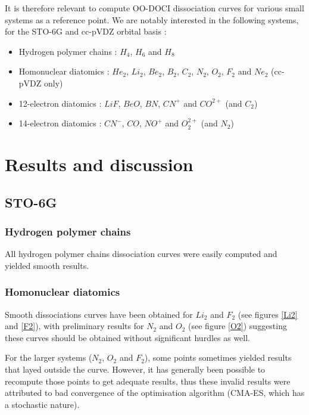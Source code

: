 \documentclass[twoside,twocolumn,9pt]{article}
\begin{document}
It is therefore relevant to compute OO-DOCI dissociation curves for various small systems as a reference point. We are notably interested in the following systems, for the STO-6G and cc-pVDZ orbital basis :

\begin{itemize}
    \item Hydrogen polymer chains : $H_4$, $H_6$ and $H_8$ 
    \item Homonuclear diatomics : $He_2$, $Li_2$, $Be_2$, $B_2$, $C_2$, $N_2$, $O_2$, $F_2$ and $Ne_2$ (cc-pVDZ only)
    \item 12-electron diatomics : 
    $LiF$, $BeO$, $BN$, $CN^+$ and $CO^{2+}$ (and $C_2$)
    \item 14-electron diatomics : 
    $CN^-$, $CO$, $NO^+$ and $O_2^{2+}$ (and $N_2$)
\end{itemize}


\section{Results and discussion}
\subsection{STO-6G}
\subsubsection{Hydrogen polymer chains}
All hydrogen polymer chains dissociation curves were easily computed and yielded smooth results. 


\subsubsection{Homonuclear diatomics}
Smooth dissociations curves have been obtained for $Li_2$ and $F_2$ (see figures \ref{Li2} and \ref{F2}), with preliminary results for $N_2$ and $O_2$ (see figure \ref{O2}) suggesting these curves should be obtained without significant hurdles as well.

For the larger systems ($N_2$, $O_2$ and $F_2$), some points sometimes yielded results that layed outside the curve. However, it has generally been possible to recompute those points to get adequate results, thus these invalid results were attributed to bad convergence of the optimisation algorithm (CMA-ES, which has a stochastic nature).
\end{document}
